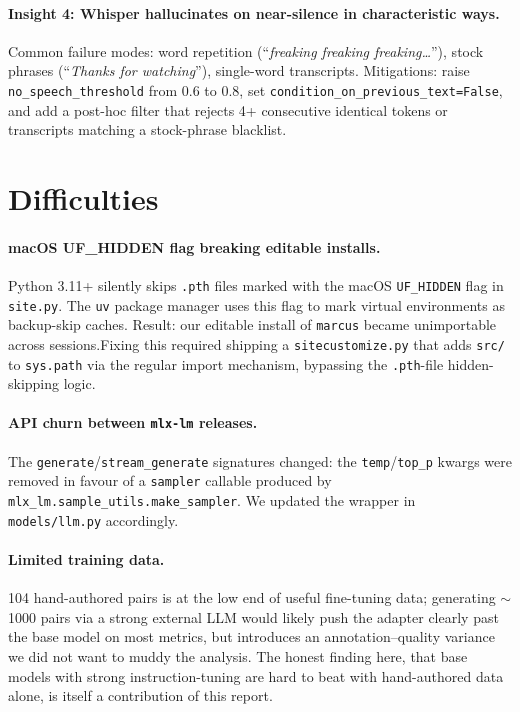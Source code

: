 \documentclass{ecsproject}
\begin{document}
\paragraph{Insight 4: Whisper hallucinates on near-silence in
characteristic ways.}
Common failure modes: word repetition (``\emph{freaking freaking
freaking\ldots}''), stock phrases (``\emph{Thanks for watching}''),
single-word transcripts. Mitigations: raise
\texttt{no\_speech\_threshold} from 0.6 to 0.8, set
\texttt{condition\_on\_previous\_text=False}, and add a post-hoc
filter that rejects 4+ consecutive identical tokens or transcripts
matching a stock-phrase blacklist.

\section{Difficulties}

\paragraph{macOS UF\_HIDDEN flag breaking editable installs.}
Python 3.11+ silently skips \texttt{.pth} files marked with the
macOS \texttt{UF\_HIDDEN} flag in \texttt{site.py}. The \texttt{uv}
package manager uses this flag to mark virtual environments as
backup-skip caches. Result: our editable install of \texttt{marcus}
became unimportable across sessions.\@ Fixing this required shipping
a \texttt{sitecustomize.py} that adds \texttt{src/} to
\texttt{sys.path} via the regular import mechanism, bypassing the
\texttt{.pth}-file hidden-skipping logic.

\paragraph{API churn between \texttt{mlx-lm} releases.}
The \texttt{generate}/\texttt{stream\_generate} signatures changed:
the \texttt{temp}/\texttt{top\_p} kwargs were removed in favour of
a \texttt{sampler} callable produced by
\texttt{mlx\_lm.sample\_utils.make\_sampler}. We updated the wrapper
in \texttt{models/llm.py} accordingly.

\paragraph{Limited training data.}
104 hand-authored pairs is at the low end of useful fine-tuning data;
generating $\sim$1000 pairs via a strong external LLM would likely
push the adapter clearly past the base model on most metrics, but
introduces an annotation--quality variance we did not want to muddy
the analysis. The honest finding here, that base models with strong
instruction-tuning are hard to beat with hand-authored data alone,
is itself a contribution of this report.
\end{document}
